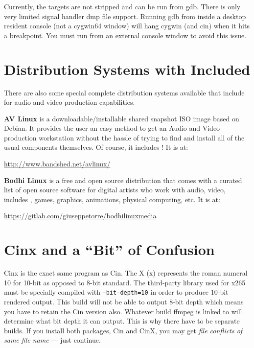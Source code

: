 Currently, the targets are not stripped and can be run from gdb.
There is only very limited signal handler dmp file support.
Running gdb from inside a desktop resident console (not a cygwin64 window) will hang cygwin (and cin) when it hits a breakpoint.  You must run from an external console window to avoid this issue.


\section{Distribution Systems with \CGG{} Included}%
\label{sec:distribution_systems_with_cinelerra_included}

There are also some special complete distribution systems available that include \CGG{} for audio and video production capabilities.

\textbf{AV Linux} is a downloadable/installable shared snapshot ISO image based on Debian. 
It provides the user an easy method to get an Audio and Video production workstation without the hassle of trying to find and install all of the usual components themselves. 
Of course, it includes \CGG{}!  
It is at:

\begin{center}
	{\small \url{http://www.bandshed.net/avlinux/}}
\end{center}

\textbf{Bodhi Linux} is a free and open source distribution that comes with a curated list of open source software for digital artists who work with audio, video, includes \CGG{}, games, graphics, animations, physical computing, etc.  
It is at:

\begin{center}
	{\small \url{https://gitlab.com/giuseppetorre/bodhilinuxmedia}}
\end{center}	

\section{Cinx and a “Bit” of Confusion}%
\label{sec:cinx_and_a_bit_of_confusion}

Cinx is the exact same program as Cin.  
The X (x) represents the roman numeral 10 for 10-bit as opposed to 8-bit standard.  
The third-party library used for x265 must be specially compiled with \texttt{--bit-depth=10} in order to produce 10-bit rendered output.  
This build will not be able to output 8-bit depth which means you have to retain the Cin version also.  
Whatever build ffmpeg is linked to will determine what bit depth it can output.  
This is why there have to be separate builds.  
If you install both packages, Cin and CinX, you may get \textit{file conflicts of same file name} --- just continue.

